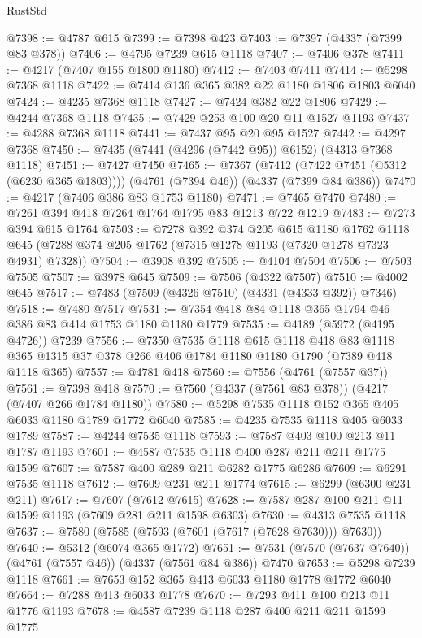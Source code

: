 \begin{lexlean}{RustStd}
\begin{coremodule}
{\begin{coremodule}
{{{{{{{{{{{{{{{{{{{{{{{{{{{{{{{{@7398 := @4787 @615
@7399 := @7398 @423
@7403 := @7397 (@4337 (@7399 @83 @378))
@7406 := @4795 @7239 @615 @1118
@7407 := @7406 @378
@7411 := @4217 (@7407 @155 @1800 @1180)
@7412 := @7403 @7411
@7414 := @5298 @7368 @1118
@7422 := @7414 @136 @365 @382 @22 @1180 @1806 @1803 @6040
@7424 := @4235 @7368 @1118
@7427 := @7424 @382 @22 @1806
@7429 := @4244 @7368 @1118
@7435 := @7429 @253 @100 @20 @11 @1527 @1193
@7437 := @4288 @7368 @1118
@7441 := @7437 @95 @20 @95 @1527
@7442 := @4297 @7368
@7450 := @7435 (@7441 (@4296 (@7442 @95)) @6152) (@4313 @7368 @1118)
@7451 := @7427 @7450
@7465 := @7367
    (@7412 (@7422 @7451 (@5312 (@6230 @365 @1803))))
    (@4761 (@7394 @46))
    (@4337 (@7399 @84 @386))
@7470 := @4217 (@7406 @386 @83 @1753 @1180)
@7471 := @7465 @7470
@7480 := @7261 @394 @418 @7264 @1764 @1795 @83 @1213 @722 @1219
@7483 := @7273 @394 @615 @1764
@7503 := @7278
    @392
    @374
    @205
    @615
    @1180
    @1762
    @1118
    @645
    (@7288 @374 @205 @1762 (@7315 @1278 @1193 (@7320 @1278 @7323 @4931) @7328))
@7504 := @3908 @392
@7505 := @4104 @7504
@7506 := @7503 @7505
@7507 := @3978 @645
@7509 := @7506 (@4322 @7507)
@7510 := @4002 @645
@7517 := @7483 (@7509 (@4326 @7510) (@4331 (@4333 @392)) @7346)
@7518 := @7480 @7517
@7531 := @7354 @418 @84 @1118 @365 @1794 @46 @386 @83 @414 @1753 @1180 @1180 @1779
@7535 := @4189 (@5972 (@4195 @4726)) @7239
@7556 := @7350
    @7535
    @1118
    @615
    @1118
    @418
    @83
    @1118
    @365
    @1315
    @37
    @378
    @266
    @406
    @1784
    @1180
    @1180
    @1790
    (@7389 @418 @1118 @365)
@7557 := @4781 @418
@7560 := @7556 (@4761 (@7557 @37))
@7561 := @7398 @418
@7570 := @7560 (@4337 (@7561 @83 @378)) (@4217 (@7407 @266 @1784 @1180))
@7580 := @5298 @7535 @1118 @152 @365 @405 @6033 @1180 @1789 @1772 @6040
@7585 := @4235 @7535 @1118 @405 @6033 @1789
@7587 := @4244 @7535 @1118
@7593 := @7587 @403 @100 @213 @11 @1787 @1193
@7601 := @4587 @7535 @1118 @400 @287 @211 @211 @1775 @1599
@7607 := @7587 @400 @289 @211 @6282 @1775 @6286
@7609 := @6291 @7535 @1118
@7612 := @7609 @231 @211 @1774
@7615 := @6299 (@6300 @231 @211)
@7617 := @7607 (@7612 @7615)
@7628 := @7587 @287 @100 @211 @11 @1599 @1193 (@7609 @281 @211 @1598 @6303)
@7630 := @4313 @7535 @1118
@7637 := @7580 (@7585 (@7593 (@7601 (@7617 (@7628 @7630))) @7630))
@7640 := @5312 (@6074 @365 @1772)
@7651 := @7531 (@7570 (@7637 @7640)) (@4761 (@7557 @46)) (@4337 (@7561 @84 @386)) @7470
@7653 := @5298 @7239 @1118
@7661 := @7653 @152 @365 @413 @6033 @1180 @1778 @1772 @6040
@7664 := @7288 @413 @6033 @1778
@7670 := @7293 @411 @100 @213 @11 @1776 @1193
@7678 := @4587 @7239 @1118 @287 @400 @211 @211 @1599 @1775
}}}}}}}}}}}}}}}}}}}}}}}}}}}}}}}}
\end{coremodule}}
\end{coremodule}
\end{lexlean}
